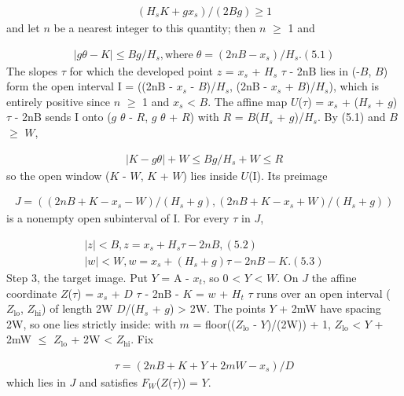 \documentclass[11pt]{article}
\begin{document}
\begin{gather*}
(H_{s} K + g x_{s})/(2Bg) \ge  1
\end{gather*}
and let \(n\) be a nearest integer to this quantity; then \(n\) \(\ge\) 1 and

\begin{gather*}
|g \theta - K| \le  Bg/H_{s},   \text{where}\; \theta = (2nB - x_{s})/H_{s}.            (5.1)
\end{gather*}
The slopes \(\tau\) for which the developed point \(z\) = \(x_{s}\) + \(H_{s}\) \(\tau\) - 2nB lies in (-\(B\), \(B\)) form the open interval I = ((2nB - \(x_{s}\) - \(B\))/\(H_{s}\), (2nB - \(x_{s}\) + \(B\))/\(H_{s}\)), which is entirely positive since \(n\) \(\ge\) 1 and \(x_{s}\) < \(B\). The affine map \(U\)(\(\tau\)) = \(x_{s}\) + (\(H_{s}\) + \(g\)) \(\tau\) - 2nB sends I onto (\(g\) \(\theta\) - \(R\), \(g\) \(\theta\) + \(R\)) with \(R\) = \(B\)(\(H_{s}\) + \(g\))/\(H_{s}\). By (5.1) and \(B\) \(\ge\) \(W\),

\begin{gather*}
|K - g \theta| + W \le  Bg/H_{s} + W \le  R
\end{gather*}
so the open window (\(K\) - \(W\), \(K\) + \(W\)) lies inside \(U\)(I). Its preimage

\begin{gather*}
J = ((2nB + K - x_{s} - W)/(H_{s} + g), (2nB + K - x_{s} + W)/(H_{s} + g))
\end{gather*}
is a nonempty open subinterval of I. For every \(\tau\) in \(J\),

\begin{gather*}
|z| < B,   z = x_{s} + H_{s} \tau - 2nB,                               (5.2) \\
|w| < W,   w = x_{s} + (H_{s} + g) \tau - 2nB - K.                     (5.3)
\end{gather*}
Step 3, the target image. Put \(Y\) = A - \(x_{t}\), so 0 < \(Y\) < \(W\). On \(J\) the affine coordinate \(Z\)(\(\tau\)) = \(x_{s}\) + \(D\) \(\tau\) - 2nB - \(K\) = \(w\) + \(H_{t}\) \(\tau\) runs over an open interval (\(Z_{\mathrm{lo}}\), \(Z_{\mathrm{hi}}\)) of length 2W \(D\)/(\(H_{s}\) + \(g\)) > 2W. The points \(Y\) + 2mW have spacing 2W, so one lies strictly inside: with \(m\) = floor((\(Z_{\mathrm{lo}}\) - \(Y\))/(2W)) + 1, \(Z_{\mathrm{lo}}\) < \(Y\) + 2mW \(\le\) \(Z_{\mathrm{lo}}\) + 2W < \(Z_{\mathrm{hi}}\). Fix

\begin{gather*}
\tau = (2nB + K + Y + 2mW - x_{s})/D
\end{gather*}
which lies in \(J\) and satisfies \(F_{W}\)(\(Z\)(\(\tau\))) = \(Y\).
\end{document}
